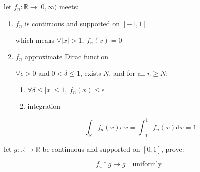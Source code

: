 \begin{thm}
    let $f_n: \mathbb{R} \to [0, \infty)$ meets:

    \begin{enumerate}
        \item $f_n$ is continuous and supported on $[-1,1]$

        which means $\forall |x| > 1,\: f_n(x)= 0$
        

        \item $f_n$ approximate Dirac function


$\forall \epsilon > 0$ and $ 0 < \delta \le 1$, exists $N$, and for all $n \ge N$:

        \begin{enumerate}
            \item $\forall \delta \le |x| \le 1,\: f_n(x) \le \epsilon$

            \item integration


    \[
        \int_{\mathbb{R}} f_n(x) \mathrm{d}x = \int_{-1}^{1} f_n(x) \mathrm{d}x = 1
    \]
        \end{enumerate}


    \end{enumerate}


let $g: \mathbb{R} \to \mathbb{R}$ be continuous and supported on $[0,1]$, prove:

\[
    f_n \ast g \to g \quad \mathrm{uniformly}
\]
\end{thm}

